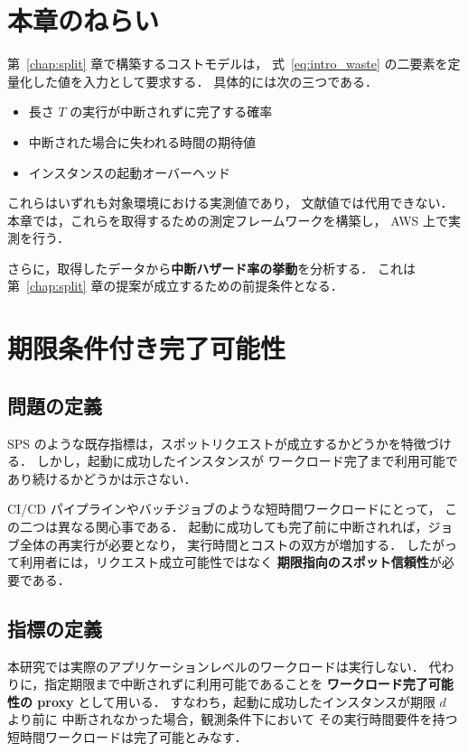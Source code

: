 \documentclass[11pt,a4paper]{ltjsreport}
\begin{document}
\section{本章のねらい}

第~\ref{chap:split} 章で構築するコストモデルは，
式~\eqref{eq:intro_waste} の二要素を定量化した値を入力として要求する．
具体的には次の三つである．

\begin{itemize}
  \item 長さ $T$ の実行が中断されずに完了する確率
  \item 中断された場合に失われる時間の期待値
  \item インスタンスの起動オーバーヘッド
\end{itemize}

これらはいずれも対象環境における実測値であり，
文献値では代用できない．
本章では，これらを取得するための測定フレームワークを構築し，
AWS 上で実測を行う．

さらに，取得したデータから\textbf{中断ハザード率の挙動}を分析する．
これは第~\ref{chap:split} 章の提案が成立するための前提条件となる．

\section{期限条件付き完了可能性}

\subsection{問題の定義}

SPS のような既存指標は，スポットリクエストが成立するかどうかを特徴づける．
しかし，起動に成功したインスタンスが
ワークロード完了まで利用可能であり続けるかどうかは示さない．

CI/CD パイプラインやバッチジョブのような短時間ワークロードにとって，
この二つは異なる関心事である．
起動に成功しても完了前に中断されれば，ジョブ全体の再実行が必要となり，
実行時間とコストの双方が増加する．
したがって利用者には，リクエスト成立可能性ではなく
\textbf{期限指向のスポット信頼性}が必要である．

\subsection{指標の定義}

本研究では実際のアプリケーションレベルのワークロードは実行しない．
代わりに，指定期限まで中断されずに利用可能であることを
\textbf{ワークロード完了可能性の proxy} として用いる．
すなわち，起動に成功したインスタンスが期限 $d$ より前に
中断されなかった場合，観測条件下において
その実行時間要件を持つ短時間ワークロードは完了可能とみなす．
\end{document}
